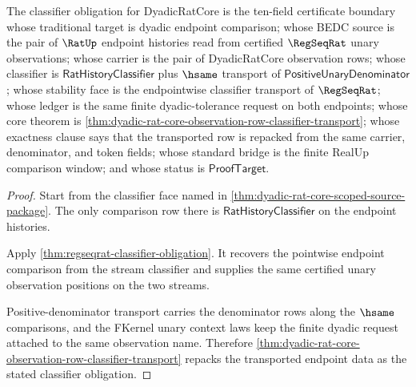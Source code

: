 \begin{theorem}
\label{thm:dyadic-rat-core-classifier-obligation}
The classifier obligation for DyadicRatCore is the ten-field certificate
boundary whose traditional target is dyadic endpoint comparison; whose BEDC
source is the pair of $\RatUp$ endpoint histories read from certified
$\RegSeqRat$ unary observations; whose carrier is the pair of DyadicRatCore
observation rows; whose classifier is $\mathsf{RatHistoryClassifier}$ plus
$\hsame$ transport of $\mathsf{PositiveUnaryDenominator}$; whose stability face
is the endpointwise classifier transport of $\RegSeqRat$; whose ledger is the
same finite dyadic-tolerance request on both endpoints; whose core theorem is
\autoref{thm:dyadic-rat-core-observation-row-classifier-transport}; whose
exactness clause says that the transported row is repacked from the same
carrier, denominator, and token fields; whose standard bridge is the finite
RealUp comparison window; and whose status is $\mathsf{ProofTarget}$.
\end{theorem}
\begin{proof}
Start from the classifier face named in
\autoref{thm:dyadic-rat-core-scoped-source-package}. The only comparison row
there is $\mathsf{RatHistoryClassifier}$ on the endpoint histories.

Apply \autoref{thm:regseqrat-classifier-obligation}. It recovers the
pointwise endpoint comparison from the stream classifier and supplies the
same certified unary observation positions on the two streams.

Positive-denominator transport carries the denominator rows along the
$\hsame$ comparisons, and the FKernel unary context laws keep the finite
dyadic request attached to the same observation name. Therefore
\autoref{thm:dyadic-rat-core-observation-row-classifier-transport} repacks
the transported endpoint data as the stated classifier obligation.
\end{proof}

